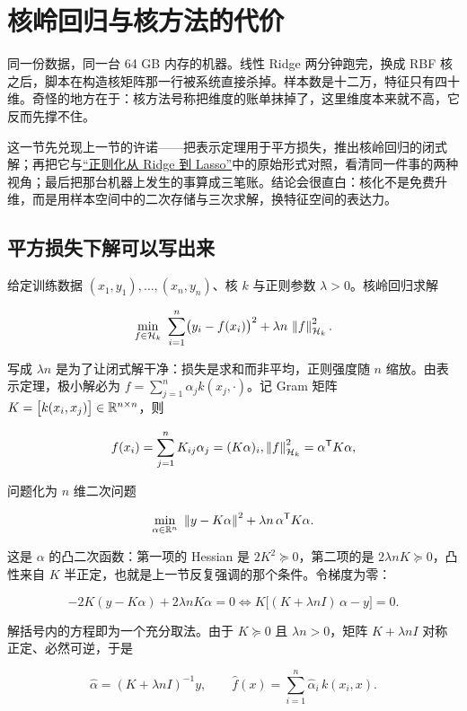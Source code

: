 \section{核岭回归与核方法的代价}
\label{sec:13-Machine-Learning/09-Kernel-Methods-and-Gaussian-Processes/04}

同一份数据，同一台 64 GB 内存的机器。线性 Ridge 两分钟跑完，换成 RBF 核之后，脚本在构造核矩阵那一行被系统直接杀掉。样本数是十二万，特征只有四十维。奇怪的地方在于：核方法号称把维度的账单抹掉了，这里维度本来就不高，它反而先撑不住。

这一节先兑现上一节的许诺——把表示定理用于平方损失，推出核岭回归的闭式解；再把它与\hyperref[sec:13-Machine-Learning/02-Linear-Models/02]{``正则化从 Ridge 到 Lasso''}中的原始形式对照，看清同一件事的两种视角；最后把那台机器上发生的事算成三笔账。结论会很直白：核化不是免费升维，而是用样本空间中的二次存储与三次求解，换特征空间的表达力。

\subsection{平方损失下解可以写出来}

给定训练数据 \((x_1,y_1),\dots,(x_n,y_n)\)、核 \(k\) 与正则参数 \(\lambda>0\)。核岭回归求解

\[
\min_{f\in\mathcal{H}_k}\
\sum_{i=1}^{n}\bigl(y_i-f(x_i)\bigr)^{2}
+\lambda n\,\left\lVert f\right\rVert_{\mathcal{H}_k}^{2}.
\]

写成 \(\lambda n\) 是为了让闭式解干净：损失是求和而非平均，正则强度随 \(n\) 缩放。由表示定理，极小解必为 \(f=\sum_{j=1}^{n}\alpha_j k(x_j,\cdot)\)。记 Gram 矩阵 \(K=\bigl[k(x_i,x_j)\bigr]\in\mathbb{R}^{n\times n}\)，则

\[
f(x_i)=\sum_{j=1}^{n}K_{ij}\alpha_j=(K\alpha)_i,
\space
\left\lVert f\right\rVert_{\mathcal{H}_k}^{2}=\alpha^{\mathsf{T}}K\alpha,
\]

问题化为 \(n\) 维二次问题

\[
\min_{\alpha\in\mathbb{R}^{n}}\
\left\lVert y-K\alpha\right\rVert^{2}+\lambda n\,\alpha^{\mathsf{T}}K\alpha.
\]

这是 \(\alpha\) 的凸二次函数：第一项的 Hessian 是 \(2K^{2}\succeq0\)，第二项的是 \(2\lambda nK\succeq0\)，凸性来自 \(K\) 半正定，也就是上一节反复强调的那个条件。令梯度为零：

\[
-2K(y-K\alpha)+2\lambda nK\alpha=0
\iff
K\bigl[(K+\lambda nI)\,\alpha-y\bigr]=0.
\]

解括号内的方程即为一个充分取法。由于 \(K\succeq0\) 且 \(\lambda n>0\)，矩阵 \(K+\lambda nI\) 对称正定、必然可逆，于是

\[
\widehat\alpha=(K+\lambda nI)^{-1}y,
\qquad
\widehat f(x)=\sum_{i=1}^{n}\widehat\alpha_i\,k(x_i,x).
\]

